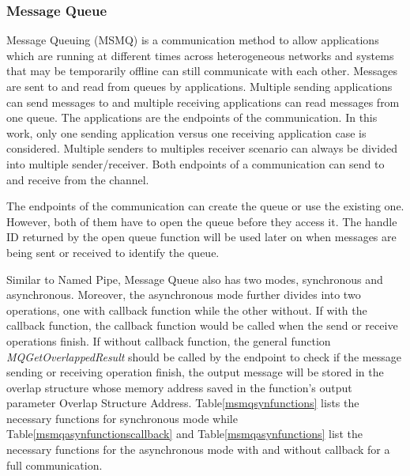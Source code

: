 \subsubsection{Message Queue }
Message Queuing (MSMQ) is a communication method to allow applications which are running at different times across heterogeneous networks and systems that may be temporarily offline can still communicate with each other. Messages are sent to and read from queues by applications. Multiple sending applications can send messages to and multiple receiving applications can read messages from one queue. \cite{redkar2004pro} The applications are the endpoints of the communication. In this work, only one sending application versus one receiving application case is considered. Multiple senders to multiples receiver scenario can always be divided into multiple sender/receiver. Both endpoints of a communication can send to and receive from the channel.

The endpoints of the communication can create the queue or use the existing one. However, both of them have to open the queue before they access it. The handle ID returned by the open queue function will be used later on when messages are being sent or received to identify the queue.

Similar to Named Pipe, Message Queue also has two modes, synchronous and asynchronous. Moreover, the asynchronous mode further divides into two operations, one with callback function while the other without. If with the callback function, the callback function would be called when the send or receive operations finish. If without callback function, the general function \textit{MQGetOverlappedResult} should be called by the endpoint to check if the message sending or receiving operation finish, the output message will be stored in the overlap structure whose memory address saved in the function's output parameter Overlap Structure Address. Table\ref{msmqsynfunctions} lists the necessary functions for synchronous mode while Table\ref{msmqasynfunctionscallback} and Table\ref{msmqasynfunctions} list the necessary functions for the asynchronous mode with and without callback for a full communication. 


